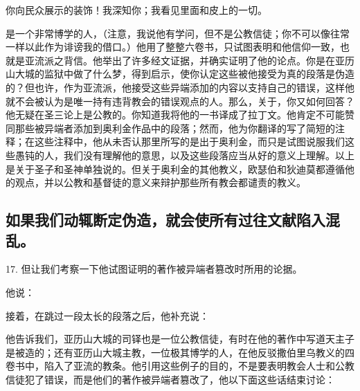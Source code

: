 你向民众展示的装饰！我深知你；\newline{}我看见里面和皮上的一切。\par

是一个非常博学的人，（注意，我说他有学问，但不是公教信徒；你不可以像往常一样以此作为诽谤我的借口。）他用了整整六卷书，只试图表明和他信仰一致，也就是亚流派之背信。他举出了许多经文证据，并确实证明了他的论点。你是在亚历山大城的监狱中做了什么梦，得到启示，使你认定这些被他接受为真的段落是伪造的？但也许，作为亚流派，他接受这些异端添加的内容以支持自己的错误，这样他就不会被认为是唯一持有违背教会的错误观点的人。那么，关于，你又如何回答？他无疑在圣三论上是公教的。你知道我将他的一书译成了拉丁文。他肯定不可能赞同那些被异端者添加到奥利金作品中的段落；然而，他为你翻译的写了简短的注释；在这些注释中，他从未否认那里所写的是出于奥利金，而只是试图说服我们这些愚钝的人，我们没有理解他的意思，以及这些段落应当从好的意义上理解。以上是关于圣子和圣神单独说的。但关于奥利金的其他教义，欧瑟伯和狄迪莫都遵循他的观点，并以公教和基督徒的意义来辩护那些所有教会都谴责的教义。\par


\subsection{如果我们动辄断定伪造，就会使所有过往文献陷入混乱。}

17. 但让我们考察一下他试图证明的著作被异端者篡改时所用的论据。\par

他说：\par

接着，在跳过一段太长的段落之后，他补充说：\par

\par

他告诉我们，亚历山大城的司铎也是一位公教信徒，有时在他的著作中写道天主子是被造的；还有亚历山大城主教，一位极其博学的人，在他反驳撒伯里乌教义的四卷书中，陷入了亚流的教条。他引用这些例子的目的，不是要表明教会人士和公教信徒犯了错误，而是他们的著作被异端者篡改了，他以下面这些话结束讨论：\par

